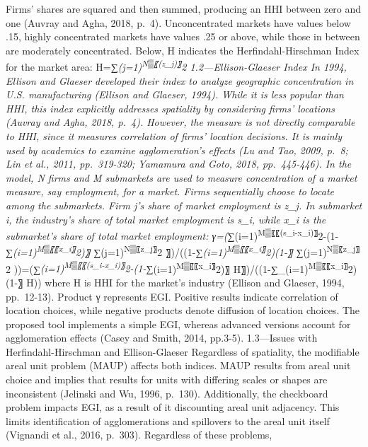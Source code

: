 \documentclass[]{article}
\begin{document}
Firms' shares are squared and then summed, producing an HHI between zero
and one (Auvray and Agha, 2018, p.~4). Unconcentrated markets have
values below .15, highly concentrated markets have values .25 or above,
while those in between are moderately concentrated. Below, H indicates
the Herfindahl-Hirschman Index for the market area:
H=∑\emph{(j=1)\textsuperscript{N▒〖(z\_j)〗}2 1.2---Ellison-Glaeser
Index In 1994, Ellison and Glaeser developed their index to analyze
geographic concentration in U.S. manufacturing (Ellison and Glaeser,
1994). While it is less popular than HHI, this index explicitly
addresses spatiality by considering firms' locations (Auvray and Agha,
2018, p.~4). However, the measure is not directly comparable to HHI,
since it measures correlation of firms' location decisions. It is mainly
used by academics to examine agglomeration's effects (Lu and Tao, 2009,
p.~8; Lin et al., 2011, pp.~319-320; Yamamura and Goto, 2018,
pp.~445-446). In the model, N firms and M submarkets are used to measure
concentration of a market measure, say employment, for a market. Firms
sequentially choose to locate among the submarkets. Firm j's share of
market employment is z\_j. In submarket i, the industry's share of total
market employment is s\_i, while x\_i is the submarket's share of total
market employment:
γ=(∑}(i=1)\textsuperscript{M▒〖〖(s\_i-x\_i)〗}2-(1-∑\emph{(i=1)\textsuperscript{M▒〖〖x\_i〗}2)〗
∑}(j=1)\textsuperscript{N▒〖z\_j〗}2
〗)/((1-∑\emph{(i=1)\textsuperscript{M▒〖〖x\_i〗}2)(1-〗
∑}(j=1)\textsuperscript{N▒〖z\_j〗}2
))=(∑\emph{(i=1)\textsuperscript{M▒〖〖(s\_i-x\_i)〗}2-(1-∑}(i=1)\textsuperscript{M▒〖〖x\_i〗}2)〗
H〗)/((1-∑\_(i=1)\textsuperscript{M▒〖〖x\_i〗}2)(1-〗 H)) where H is
HHI for the market's industry (Ellison and Glaeser, 1994, pp.~12-13).
Product γ represents EGI. Positive results indicate correlation of
location choices, while negative products denote diffusion of location
choices. The proposed tool implements a simple EGI, whereas advanced
versions account for agglomeration effects (Casey and Smith, 2014,
pp.3-5). 1.3---Issues with Herfindahl-Hirschman and Ellison-Glaeser
Regardless of spatiality, the modifiable areal unit problem (MAUP)
affects both indices. MAUP results from areal unit choice and implies
that results for units with differing scales or shapes are inconsistent
(Jelinski and Wu, 1996, p.~130). Additionally, the checkboard problem
impacts EGI, as a result of it discounting areal unit adjacency. This
limits identification of agglomerations and spillovers to the areal unit
itself (Vignandi et al., 2016, p.~303). Regardless of these problems,
\end{document}
